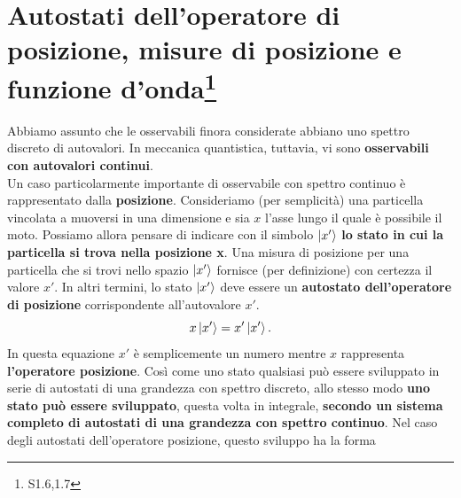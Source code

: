 \documentclass[a4paper,12pt,oneside]{book}
\newcommand*{\myfont}{\fontfamily{ppl}\selectfont}
\begin{document}
\fancypagestyle{plain}{%
\fancyhf{} %
\fancyfoot[C]{\bfseries \myfont{\thepage}} %
\renewcommand{\headrulewidth}{0pt}
\renewcommand{\footrulewidth}{0pt}}

\fancypagestyle{VS}{
\headheight = 15pt
\lhead[\myfont{\textit{\textbf{\thechapter\nouppercase{\leftmark}}}}]{\myfont{\textit{\textbf{\nouppercase{\leftmark}}}}}
\chead[]{}
\rhead[\myfont{\textbf{\thepage}}]{\myfont{\textbf{\thepage}}}

\lfoot[]{}
\cfoot[]{}
\rfoot[]{}
}



\pagestyle{VS}
\setcounter{chapter}{4}
\setcounter{page}{64}
\chapter[Autostati dell'operatore di posizione]{Autostati dell'operatore di posizione, misure di posizione e funzione d'onda\footnote{S1.6,1.7}}
Abbiamo assunto che le osservabili finora considerate abbiano uno spettro discreto di autovalori. In meccanica quantistica, tuttavia, vi sono \textbf{osservabili con autovalori continui}.\\
Un caso particolarmente importante di osservabile con spettro continuo è rappresentato dalla \textbf{posizione}.
Consideriamo (per semplicità) una particella vincolata a muoversi in una dimensione e sia $x$ l'asse lungo il quale è possibile il moto. Possiamo allora pensare di indicare con il simbolo $\ket{x'}$ \textbf{lo stato in cui la particella si trova nella posizione x}.
Una misura di posizione per una particella che si trovi nello spazio $\ket{x'}$ fornisce (per definizione) con certezza il valore $x'$. In altri termini, lo stato $\ket{x'}$ deve essere un \textbf{autostato dell'operatore di posizione} corrispondente all'autovalore $x'$.
\begin{equation}
  x\ket{x'} = x'\ket{x'} .
\end{equation}
In questa equazione $x'$ è semplicemente un numero mentre $x$ rappresenta \textbf{l'operatore posizione}.
Così come uno stato qualsiasi può essere sviluppato in serie di autostati di una grandezza con spettro discreto, allo stesso modo \textbf{uno stato può essere sviluppato}, questa volta in integrale, \textbf{secondo un sistema completo di autostati di una grandezza con spettro continuo}. Nel caso degli autostati dell'operatore posizione, questo sviluppo ha la forma
\end{document}

